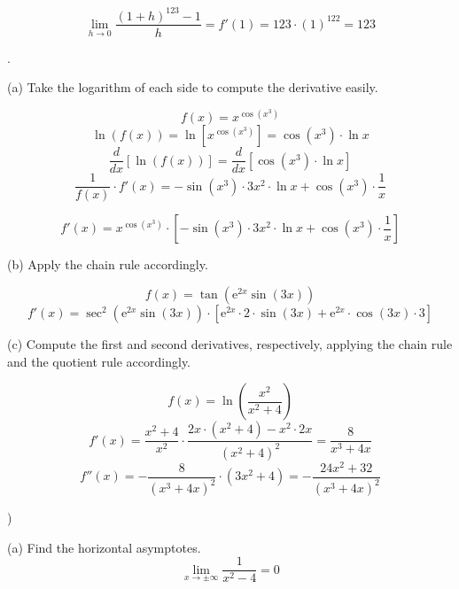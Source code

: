 \documentclass{article}
\begin{document}
\[\lim_{h\to0}\frac{(1+h)^{123}-1}{h}=f'(1)=123\cdot(1)^{122} = \boxed{123}\]

\newpage

.

\hfill

\noindent (a) Take the logarithm of each side to compute the derivative easily.

\[f(x)=x^{\cos\left(x^3\right)}\]
\[\ln(f(x))=\ln\left[x^{\cos\left(x^3\right)}\right]=\cos\left(x^3\right)\cdot\ln x\]
\[\frac{d}{dx}\left[\ln(f(x))\right] = \frac{d}{dx}\left[\cos\left(x^3\right)\cdot\ln x\right]\]
\[\frac{1}{f(x)}\cdot f'(x) = -\sin\left(x^3\right)\cdot 3x^2 \cdot \ln x + \cos\left(x^3\right)\cdot\frac1x\]

\[\boxed{f'(x) = x^{\cos\left(x^3\right)}\cdot\left[-\sin\left(x^3\right)\cdot 3x^2 \cdot \ln x + \cos\left(x^3\right)\cdot\frac1x\right]}\]

\hfill

\noindent (b) Apply the chain rule accordingly.

\begin{equation*}f(x) = \tan\left(\mathrm{e}^{2x}\sin(3x)\right)\end{equation*}
\begin{equation*}\boxed{f'(x) = \sec^2\left(\mathrm{e}^{2x}\sin(3x)\right)\cdot\left[\mathrm{e}^{2x}\cdot 2\cdot\sin(3x) + \mathrm{e}^{2x}\cdot\cos(3x)\cdot3\right]}\end{equation*}

\noindent (c) Compute the first and second derivatives, respectively, applying the chain rule and the quotient rule accordingly.

\begin{equation*}f(x) = \ln\left(\frac{x^2}{x^2+4}\right)\end{equation*}
\begin{equation*}f'(x)= \frac{x^2+4}{x^2}\cdot\frac{2x\cdot(x^2+4)-x^2\cdot2x}{\left(x^2+4\right)^2}=\frac{8}{x^3+4x}\end{equation*}
\begin{equation*}f''(x)= -\frac{8}{\left(x^3+4x\right)^2}\cdot\left(3x^2+4\right)=\boxed{-\frac{24x^2+32}{\left(x^3+4x\right)^2}}\end{equation*}

\hfill

)

\hfill

\noindent (a) Find the horizontal asymptotes.
\[\lim_{x\to\pm\infty}\frac{1}{x^2-4}=0\]
\end{document}

